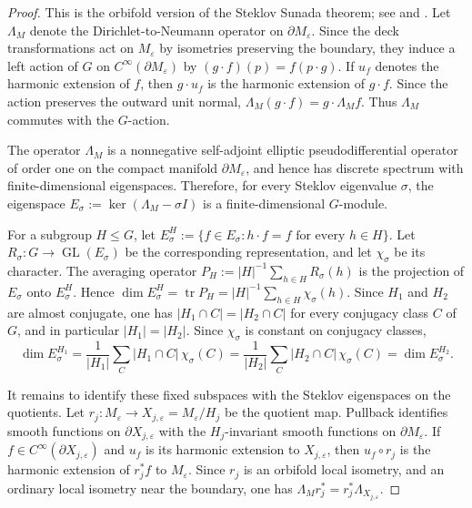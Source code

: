 \documentclass[11pt,letterpaper,reqno]{amsart}
\theoremstyle{definition}
\begin{document}
\begin{proof}
This is the orbifold version of the Steklov Sunada theorem; see
\cite[Theorem~2.3 and Remark~2.6]{GordonHerbrichWebb2021} and
\cite[Theorem~9.9]{ColboisGirouardGordonSher2024}. Let $\Lambda_M$ denote the Dirichlet-to-Neumann operator on $\partial M_\varepsilon$. Since the deck transformations act on $M_\varepsilon$ by isometries preserving the boundary, they induce a left action of $G$ on $C^\infty(\partial M_\varepsilon)$ by $(g\cdot f)(p)=f(p\cdot g)$. If $u_f$ denotes the harmonic extension of $f$, then $g\cdot u_f$ is the harmonic extension of $g\cdot f$. Since the action preserves the outward unit normal, $\Lambda_M(g\cdot f)=g\cdot\Lambda_M f$. Thus $\Lambda_M$ commutes with the $G$-action.

The operator $\Lambda_M$ is a nonnegative self-adjoint elliptic pseudodifferential operator of order one on the compact manifold $\partial M_\varepsilon$, and hence has discrete spectrum with finite-dimensional eigenspaces. Therefore, for every Steklov eigenvalue $\sigma$, the eigenspace $E_\sigma:=\ker(\Lambda_M-\sigma I)$ is a finite-dimensional $G$-module.

For a subgroup $H\le G$, let $E_\sigma^H:=\{f\in E_\sigma:h\cdot f=f\text{ for every }h\in H\}$. Let $R_\sigma:G\to\operatorname{GL}(E_\sigma)$ be the corresponding
representation, and let $\chi_\sigma$ be its character.  The averaging
operator
$P_H:=|H|^{-1}\sum_{h\in H}R_\sigma(h)$
is the projection of $E_\sigma$ onto $E_\sigma^H$. Hence $\dim E_\sigma^H=\operatorname{tr}P_H=|H|^{-1}\sum_{h\in H}\chi_\sigma(h)$. Since $H_1$ and $H_2$ are almost conjugate, one has $|H_1\cap C|=|H_2\cap C|$ for every conjugacy class $C$ of $G$, and in particular $|H_1|=|H_2|$. Since $\chi_\sigma$ is constant on conjugacy classes,
\[
\dim E_\sigma^{H_1}
=\frac{1}{|H_1|}\sum_C |H_1\cap C|\,\chi_\sigma(C)
=\frac{1}{|H_2|}\sum_C |H_2\cap C|\,\chi_\sigma(C)
=\dim E_\sigma^{H_2}.
\]

It remains to identify these fixed subspaces with the Steklov eigenspaces on the quotients. Let $r_j:M_\varepsilon\to X_{j,\varepsilon}=M_\varepsilon/H_j$ be the quotient map. Pullback identifies smooth functions on $\partial X_{j,\varepsilon}$ with the $H_j$-invariant smooth functions on $\partial M_\varepsilon$. If $f\in C^\infty(\partial X_{j,\varepsilon})$ and $u_f$ is its harmonic extension to $X_{j,\varepsilon}$, then $u_f\circ r_j$ is the harmonic extension of $r_j^*f$ to $M_\varepsilon$. Since $r_j$ is an orbifold local isometry, and an ordinary local isometry near the boundary, one has $\Lambda_M r_j^*=r_j^*\Lambda_{X_{j,\varepsilon}}$.


\end{proof}
\end{document}
